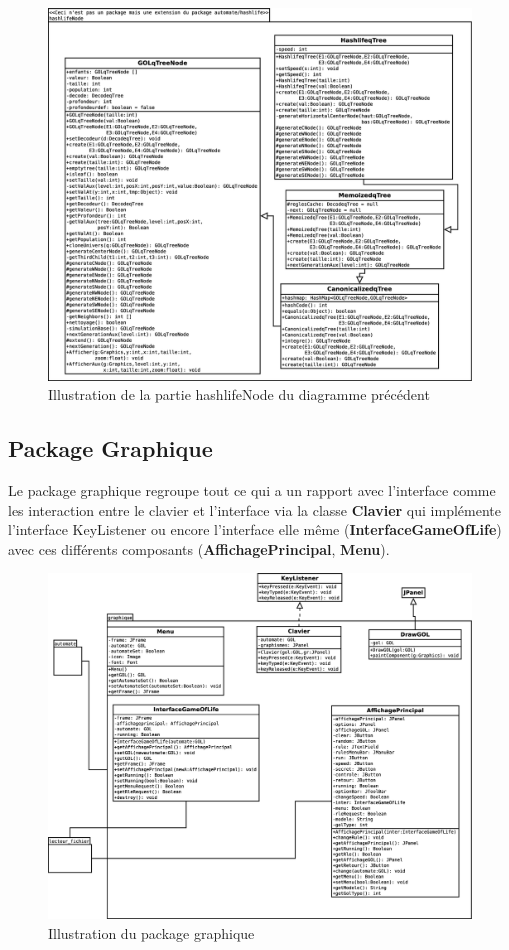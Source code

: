 \begin{figure}[htp]
\centering
\includegraphics[scale=0.22]{images/Diagramme/package_automate_hashlifeNode.eps}
\caption{\label{fig:Automate/hashlifeNode}Illustration de la partie hashlifeNode du diagramme précédent}
\end{figure}
\subsection{Package Graphique}
\par Le package graphique regroupe tout ce qui a un rapport avec l'interface comme les interaction entre le clavier et l'interface via la classe \textbf{Clavier} qui implémente l'interface KeyListener ou encore l'interface elle même (\textbf{InterfaceGameOfLife}) avec ces différents composants (\textbf{AffichagePrincipal}, \textbf{Menu}). 
\begin{figure}[htp]
\centering
\includegraphics[scale=0.22]{images/Diagramme/package_graphique.eps}
\caption{\label{fig:Graphique}Illustration du package graphique}
\end{figure}

